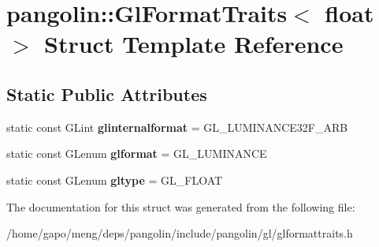 \hypertarget{structpangolin_1_1_gl_format_traits_3_01float_01_4}{}\section{pangolin\+:\+:Gl\+Format\+Traits$<$ float $>$ Struct Template Reference}
\label{structpangolin_1_1_gl_format_traits_3_01float_01_4}
\subsection*{Static Public Attributes}
\begin{DoxyCompactItemize}
\item 
static const G\+Lint {\bfseries glinternalformat} = G\+L\+\_\+\+L\+U\+M\+I\+N\+A\+N\+C\+E32\+F\+\_\+\+A\+RB\hypertarget{structpangolin_1_1_gl_format_traits_3_01float_01_4_af5cb07cae4da728ad327e78258fe90cd}{}\label{structpangolin_1_1_gl_format_traits_3_01float_01_4_af5cb07cae4da728ad327e78258fe90cd}

\item 
static const G\+Lenum {\bfseries glformat} = G\+L\+\_\+\+L\+U\+M\+I\+N\+A\+N\+CE\hypertarget{structpangolin_1_1_gl_format_traits_3_01float_01_4_a4467cee91787e92e50cfa16744b42a67}{}\label{structpangolin_1_1_gl_format_traits_3_01float_01_4_a4467cee91787e92e50cfa16744b42a67}

\item 
static const G\+Lenum {\bfseries gltype} = G\+L\+\_\+\+F\+L\+O\+AT\hypertarget{structpangolin_1_1_gl_format_traits_3_01float_01_4_acaf040d0901f223a7b390c63f6cd01f0}{}\label{structpangolin_1_1_gl_format_traits_3_01float_01_4_acaf040d0901f223a7b390c63f6cd01f0}

\end{DoxyCompactItemize}


The documentation for this struct was generated from the following file\+:\begin{DoxyCompactItemize}
\item 
/home/gapo/meng/deps/pangolin/include/pangolin/gl/glformattraits.\+h\end{DoxyCompactItemize}
